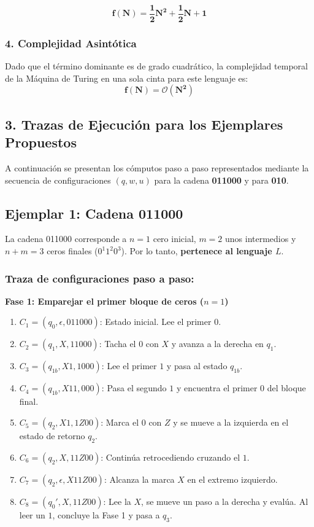 \[\mathbf{f(N) = \frac{1}{2}N^2 + \frac{1}{2}N + 1}\]

\subsubsection*{4. Complejidad Asintótica}

Dado que el término dominante es de grado cuadrático, la complejidad temporal de la Máquina de Turing en una sola cinta para este lenguaje es:
\[\mathbf{f(N) = \mathcal{O}(N^2)}\]

\subsection*{3. Trazas de Ejecución para los Ejemplares Propuestos}

A continuación se presentan los cómputos paso a paso representados mediante la secuencia de configuraciones $(q, w, u)$ para la cadena \textbf{011000} y para \textbf{010}.

\subsection*{Ejemplar 1: Cadena 011000}

La cadena 011000 corresponde a $n = 1$ cero inicial, $m = 2$ unos intermedios y $n + m = 3$ ceros finales ($0^1 1^2 0^3$). Por lo tanto, \textbf{pertenece al lenguaje $L$}.

\subsubsection*{Traza de configuraciones paso a paso:}

\noindent\textbf{Fase 1: Emparejar el primer bloque de ceros ($n = 1$)}
\begin{enumerate}[label=\arabic*., leftmargin=*]
    \item $C_1 = (q_0, \epsilon, 011000)$: Estado inicial. Lee el primer $0$.
    \item $C_2 = (q_1, X, 11000)$: Tacha el $0$ con $X$ y avanza a la derecha en $q_1$.
    \item $C_3 = (q_{1b}, X1, 1000)$: Lee el primer $1$ y pasa al estado $q_{1b}$.
    \item $C_4 = (q_{1b}, X11, 000)$: Pasa el segundo $1$ y encuentra el primer $0$ del bloque final.
    \item $C_5 = (q_2, X1, 1Z00)$: Marca el $0$ con $Z$ y se mueve a la izquierda en el estado de retorno $q_2$.
    \item $C_6 = (q_2, X, 11Z00)$: Continúa retrocediendo cruzando el $1$.
    \item $C_7 = (q_2, \epsilon, X11Z00)$: Alcanza la marca $X$ en el extremo izquierdo.
    \item $C_8 = (q_0', X, 11Z00)$: Lee la $X$, se mueve un paso a la derecha y evalúa. Al leer un $1$, concluye la Fase 1 y pasa a $q_3$.
\end{enumerate}

